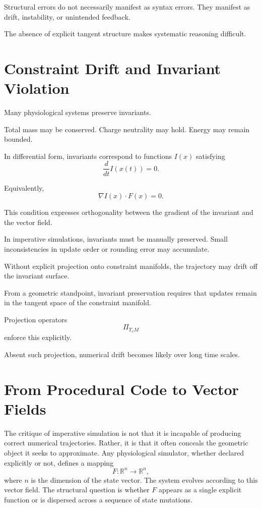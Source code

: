 \documentclass[12pt]{book}
\begin{document}
Structural errors do not necessarily manifest as syntax errors. They manifest as drift, instability, or unintended feedback.

The absence of explicit tangent structure makes systematic reasoning difficult.

\section{Constraint Drift and Invariant Violation}

Many physiological systems preserve invariants.

Total mass may be conserved. Charge neutrality may hold. Energy may remain bounded.

In differential form, invariants correspond to functions $I(x)$ satisfying
\[
\frac{d}{dt} I(x(t)) = 0.
\]

Equivalently,
\[
\nabla I(x) \cdot F(x) = 0.
\]

This condition expresses orthogonality between the gradient of the invariant and the vector field.

In imperative simulations, invariants must be manually preserved. Small inconsistencies in update order or rounding error may accumulate.

Without explicit projection onto constraint manifolds, the trajectory may drift off the invariant surface.

From a geometric standpoint, invariant preservation requires that updates remain in the tangent space of the constraint manifold.

Projection operators
\[
\Pi_{T_x M}
\]
enforce this explicitly.

Absent such projection, numerical drift becomes likely over long time scales.

\section{From Procedural Code to Vector Fields}

The critique of imperative simulation is not that it is incapable of
producing correct numerical trajectories. Rather, it is that it often
conceals the geometric object it seeks to approximate. Any
physiological simulator, whether declared explicitly or not, defines a
mapping
\[
F : \mathbb{R}^n \to \mathbb{R}^n,
\]
where $n$ is the dimension of the state vector. The system evolves
according to this vector field. The structural question is whether
$F$ appears as a single explicit function or is dispersed across a
sequence of state mutations.
\end{document}
